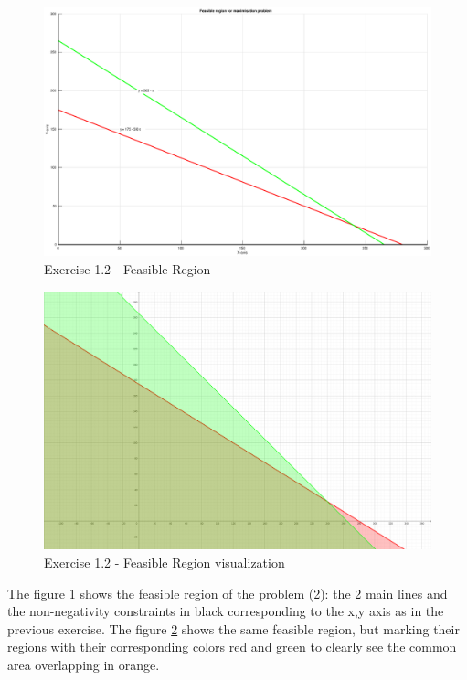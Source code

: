 \documentclass[unicode,11pt,a4paper,oneside,numbers=endperiod,openany]{scrartcl}
\begin{document}
\begin{figure}[H]
	\centering
	\caption{Exercise 1.2 - Feasible Region}
	\label{fig:ex1-2}
	\includegraphics[width=\textwidth, trim={5cm 0cm 4cm 0cm}, clip]{./figures/ex1-2.eps}
\end{figure}

\begin{figure}[H]
	\centering
	\caption{Exercise 1.2 - Feasible Region visualization}
	\label{fig:ex1-2-geogebra}
	\includegraphics[width=\textwidth, trim={110cm 25cm 75cm 20cm}, clip]{./figures/ex1-2-geogebra.png}
\end{figure}

The figure \ref{fig:ex1-2} shows the feasible region of the problem (2):
the 2 main lines and the non-negativity constraints in black corresponding to the x,y axis
as in the previous exercise.
The figure \ref{fig:ex1-2-geogebra} shows the same feasible region,
but marking their regions with their corresponding colors red and green
to clearly see the common area overlapping in orange.\\
\end{document}
